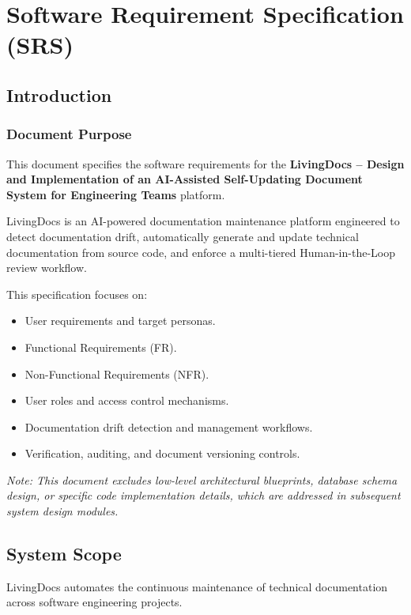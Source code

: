 \chapter{Software Requirement Specification (SRS)}

\section{Introduction}

\subsection{Document Purpose}
This document specifies the software requirements for the \textbf{LivingDocs -- Design and Implementation of an AI-Assisted Self-Updating Document System for Engineering Teams} platform.

LivingDocs is an AI-powered documentation maintenance platform engineered to detect documentation drift, automatically generate and update technical documentation from source code, and enforce a multi-tiered Human-in-the-Loop review workflow.

This specification focuses on:
\begin{itemize}
	\item User requirements and target personas.
	\item Functional Requirements (FR).
	\item Non-Functional Requirements (NFR).
	\item User roles and access control mechanisms.
	\item Documentation drift detection and management workflows.
	\item Verification, auditing, and document versioning controls.
\end{itemize}

\textit{Note: This document excludes low-level architectural blueprints, database schema design, or specific code implementation details, which are addressed in subsequent system design modules.}

\section{System Scope}
LivingDocs automates the continuous maintenance of technical documentation across software engineering projects.


